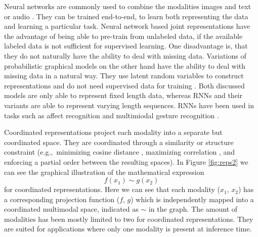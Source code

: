 \documentclass{article}
\begin{document}
Neural networks are commonly used to combine the modalities images and text \citep{silberer2014learning} or audio \citep{mroueh2015deep, ngiam2011multimodal, wu2014exploring}. They can be trained end-to-end, to learn both representing the data and learning a particular task. Neural network based joint representations have the advantage of being able to pre-train from unlabeled data, if the available labeled data is not sufficient for supervised learning. One disadvantage is, that they do not naturally have the ability to deal with missing data. Variations of probabilistic graphical models on the other hand have the ability to deal with missing data in a natural way. They use latent random variables to construct representations \citep{bengio2013represent} and do not need supervised data for training \citep{salakhutdinov2009boltz}. Both discussed models are only able to represent fixed length data, whereas RNNs and their variants are able to represent varying length sequences. RNNs have been used in tasks such as affect recognition \citep{chen2015multi, nicolaou2011contin} and multimiodal gesture recognition \citep{rajagopalan2016extend}.

Coordinated representations project each modality into a separate but coordinated space. They are coordinated through a similarity or structure constraint (e.g.,\ minimizing cosine distance \citep{frome2013devise}, maximizing correlation \citep{andrew2013deep}, and enforcing a partial order \citep{vendrov2016order} between the resulting spaces). In Figure \ref{fig:reps2} we can see the graphical illustration of the mathematical expression
\begin{equation}
f(x_1) \sim g(x_2)
\end{equation}
for coordinated representations. Here we can see that each modality ($x_1$, $x_2$) has a corresponding projection function ($f$, $g$) which is independently mapped into a coordinated multimodal space, indicated as $\sim$ in the graph. The amount of modalities has been mostly limited to two for coordinated representations. They are suited for applications where only one modality is present at inference time.
\end{document}
